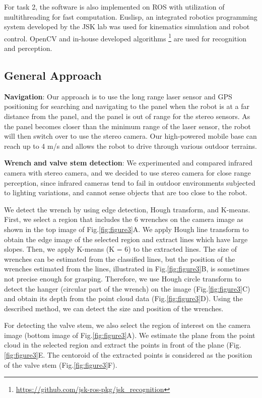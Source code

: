\documentclass{standalone}
\begin{document}
For task 2, the software is also implemented on ROS with utilization of multithreading for fast computation. Euslisp, an integrated robotics programming system developed by the JSK lab was used for kinematics simulation and robot control. OpenCV and in-house developed algorithms
 \footnote{\url{https://github.com/jsk-ros-pkg/jsk_recognition}} are used for recognition and perception.

 \subsection{General Approach}
 \textbf{Navigation}: Our approach is to use the long range laser sensor and GPS positioning for searching and navigating to the panel when the robot is at a far distance from the panel, and the panel is out of range for the stereo sensors.  %
As the panel becomes closer than the minimum range of the laser sensor, the robot will then switch over to use the stereo camera. Our high-powered mobile base can reach up to 4 m/s and allows the robot to drive through various outdoor terrains. 

\textbf{Wrench and valve stem detection}: We experimented and compared infrared camera with stereo camera, and we decided to use stereo camera for close range perception, since infrared cameras tend to fail in outdoor environments subjected to lighting variations, and cannot sense objects that are too close to the robot. 

We detect the wrench by using edge detection, Hough transform, and K-means. First, we select a region that includes the 6 wrenches on the camera image as shown in the top image of Fig.\ref{fig:figure3}A. We apply Hough line transform to obtain the edge image of the selected region and extract lines which have large slopes. Then, we apply K-means (K = 6) to the extracted lines. The size of wrenches can be estimated from the classified lines, but the position of the wrenches estimated from the lines, illustrated in Fig.\ref{fig:figure3}B, is sometimes not precise enough for grasping. Therefore, we use Hough circle transform to detect the hanger (circular part of the wrench) on the image (Fig.\ref{fig:figure3}C) and obtain its depth from the point cloud data (Fig.\ref{fig:figure3}D). Using the described method, we can detect the size and position of the wrenches. 

For detecting the valve stem, we also select the region of interest on the camera image (bottom image of Fig.\ref{fig:figure3}A). We estimate the plane from the point cloud in the selected region and extract the points in front of the plane (Fig.\ref{fig:figure3}E. The centoroid of the extracted points is considered as the position of the valve stem (Fig.\ref{fig:figure3}F).
\end{document}
